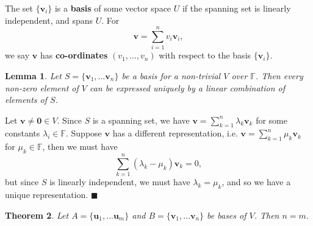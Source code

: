 \documentclass[letter-paper]{tufte-book}
\newtheorem{theorem}{\color{pastel-blue}Theorem}[section]
\newtheorem{lemma}[theorem]{\color{pastel-blue}Lemma}
\newenvironment{proof}[1][Proof]{\begin{trivlist}
\item[\hskip \labelsep {\bfseries #1}]}{\end{trivlist}}
\newcommand{\Ob}{{\boldsymbol{0}}}
\newcommand{\ub}{{\boldsymbol{u}}}
\newcommand{\vb}{{\boldsymbol{v}}}
\newcommand{\qed}{\hfill$\blacksquare$}
\begin{document}
The set $\{\vb_i\}$ is a \textbf{basis} of some vector space $U$ if the spanning set is linearly independent, and spans $U$. For
\begin{equation}
  \vb = \sum_{i=1}^n v_i \vb_i,
\end{equation}
we say $\vb$ has \textbf{co-ordinates} $(v_1, \ldots, v_n)$ with respect to the basis $\{\vb_i\}$.

\begin{lemma}
  Let $S = \{\vb_1, \ldots \vb_n\}$ be a basis for a non-trivial $V$ over $\mathbb{F}$. Then every non-zero element of $V$ can be expressed \emph{uniquely} by a linear combination of elements of $S$.
\end{lemma}

\begin{proof}
  Let $\vb \neq \Ob \in V$. Since $S$ is a spanning set, we have $\vb = \sum_{k=1}^n \lambda_k \vb_k$ for some constants $\lambda_i \in \mathbb{F}$. Suppose $\vb$ has a different representation, i.e. $\vb = \sum_{k=1}^n \mu_k \vb_k$ for $\mu_k \in \mathbb{F}$, then we must have
  \begin{equation*}
    \sum_{k=1}^n (\lambda_k - \mu_k)\vb_k = 0,
  \end{equation*}
  but since $S$ is linearly independent, we must have $\lambda_k = \mu_k$, and so we have a unique representation. \qed
\end{proof}

\begin{theorem}
  Let $A = \{\ub_1, \ldots \ub_m\}$ and $B = \{\vb_1, \ldots \vb_n\}$ be bases of $V$. Then $n=m$.
\end{theorem}
\end{document}
